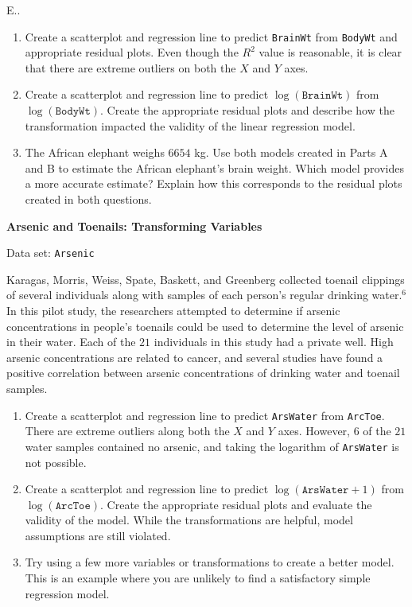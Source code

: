 \documentclass[
]{report}
\newcounter{excount}
\begin{document}
\begin{list}{E..}{ \setlength{\itemsep}{1.2em}}
    \begin{enumerate}
      \item Create a scatterplot and regression line to predict \texttt{BrainWt} from \texttt{BodyWt} and appropriate residual plots. Even though the $R^2$ value is reasonable, it is clear that there are extreme outliers on both the $X$ and $Y$ axes.
      \item Create a scatterplot and regression line to predict $\log(\texttt{BrainWt})$ from $\log(\texttt{BodyWt})$. Create the appropriate residual plots and describe how the transformation impacted the validity of the linear regression model.
      \item The African elephant weighs $6654$ kg. Use both models created in Parts A and B to estimate the African elephant’s brain weight. Which model provides a more accurate estimate? Explain how this corresponds to the residual plots created in both questions.
    \end{enumerate}

  \item \textbf{Arsenic and Toenails: Transforming Variables}

Data set: \texttt{Arsenic}

Karagas, Morris, Weiss, Spate, Baskett, and Greenberg collected toenail clippings of several individuals along with samples of each person’s regular drinking water.$^6$ In this pilot study, the researchers attempted to determine if arsenic concentrations in people’s toenails could be used to determine the level of arsenic in their water. Each of the $21$ individuals in this study had a private well. High arsenic concentrations are related to cancer, and several studies have found a positive correlation between arsenic concentrations of drinking water and toenail samples.

    \begin{enumerate}
      \item Create a scatterplot and regression line to predict \texttt{ArsWater} from \texttt{ArcToe}. There are extreme outliers along both the $X$ and $Y$ axes. However, $6$ of the $21$ water samples contained no arsenic, and taking the logarithm of \texttt{ArsWater} is not possible.
      \item Create a scatterplot and regression line to predict $\log(\texttt{ArsWater} + 1)$ from $\log(\texttt{ArcToe})$. Create the appropriate residual plots and evaluate the validity of the model. While the transformations are helpful, model assumptions are still violated.
      \item Try using a few more variables or transformations to create a better model. This is an example where you are unlikely to find a satisfactory simple regression model.
    \end{enumerate}


\end{list}
\end{document}
